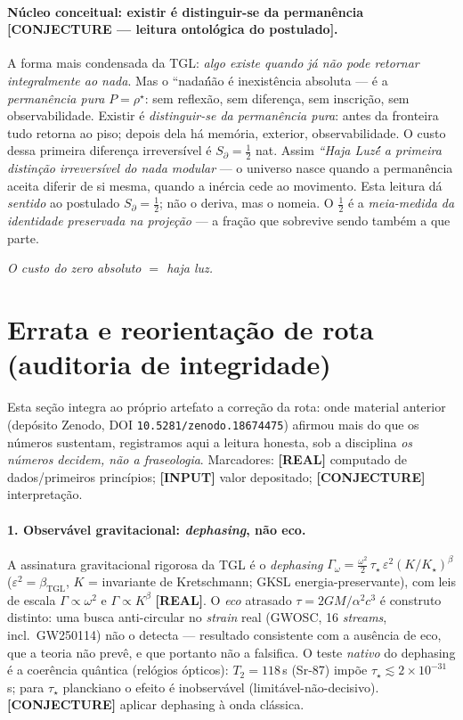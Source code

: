 \documentclass[12pt,a4paper]{article}
\newcommand{\betatgl}{\beta_{\text{TGL}}}
\newcommand{\rhostar}{\rho^{\star}}
\newcommand{\TGL}{\textsc{TGL}}
\begin{document}
\paragraph{Núcleo conceitual: existir é distinguir-se da permanência \textbf{[CONJECTURE --- leitura ontológica do postulado]}.} A forma mais condensada da \TGL{}: \emph{algo existe quando já não pode retornar integralmente ao nada}. Mas o ``nada\'\' não é inexistência absoluta --- é a \emph{permanência pura} $P = \rhostar$: sem reflexão, sem diferença, sem inscrição, sem observabilidade. Existir é \emph{distinguir-se da permanência pura}: antes da fronteira tudo retorna ao piso; depois dela há memória, exterior, observabilidade. O custo dessa primeira diferença irreversível é $S_\partial = \tfrac12$ nat. Assim \emph{``Haja Luz\'\' é a primeira distinção irreversível do nada modular} --- o universo nasce quando a permanência aceita diferir de si mesma, quando a inércia cede ao movimento. Esta leitura dá \emph{sentido} ao postulado $S_\partial = \tfrac12$; não o deriva, mas o nomeia. O $\tfrac12$ é a \emph{meia-medida da identidade preservada na projeção} --- a fração que sobrevive sendo também a que parte.

\begin{center}\emph{O custo do zero absoluto $=$ haja luz.}\end{center}

\section{Errata e reorientação de rota (auditoria de integridade)}
\label{sec:errata}
Esta seção integra ao próprio artefato a correção da rota: onde material anterior (depósito Zenodo, DOI \texttt{10.5281/zenodo.18674475}) afirmou mais do que os números sustentam, registramos aqui a leitura honesta, sob a disciplina \emph{os números decidem, não a fraseologia}.  Marcadores: \textbf{[REAL]} computado de dados/primeiros princípios; \textbf{[INPUT]} valor depositado; \textbf{[CONJECTURE]} interpretação.

\paragraph{1. Observável gravitacional: \emph{dephasing}, não eco.} A assinatura gravitacional rigorosa da \TGL{} é o \emph{dephasing} $\Gamma_\omega=\tfrac{\omega^2}{2}\,\tau_\star\,\varepsilon^2(K/K_\star)^{\beta}$ ($\varepsilon^2=\betatgl$, $K$ = invariante de Kretschmann; GKSL energia-preservante), com leis de escala $\Gamma\propto\omega^2$ e $\Gamma\propto K^{\beta}$ \textbf{[REAL]}.  O \emph{eco} atrasado $\tau=2GM/\alpha^2c^3$ é construto distinto: uma busca anti-circular no \emph{strain} real (GWOSC, 16 \emph{streams}, incl.\ GW250114) não o detecta --- resultado consistente com a ausência de eco, que a teoria não prevê, e que portanto não a falsifica.  O teste \emph{nativo} do dephasing é a coerência quântica (relógios ópticos): $T_2=118$\,s (Sr-87) impõe $\tau_\star\lesssim 2\times10^{-31}$\,s; para $\tau_\star$ planckiano o efeito é inobservável (limitável-não-decisivo). \textbf{[CONJECTURE]} aplicar dephasing à onda clássica.
\end{document}
